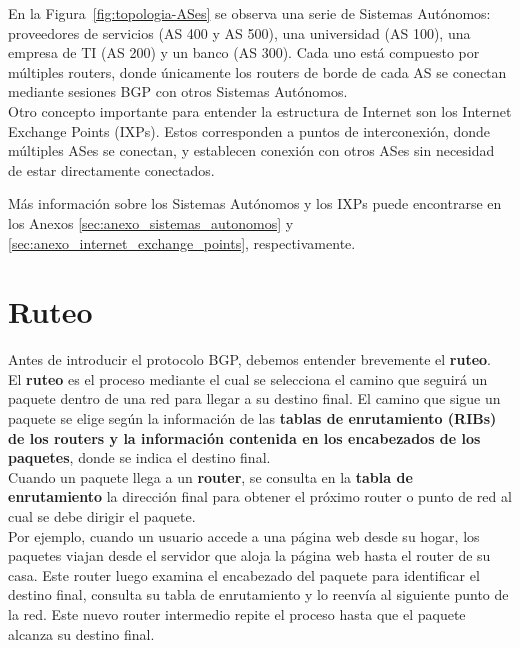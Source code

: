 En la Figura~\ref{fig:topologia-ASes} se observa una serie de Sistemas Autónomos: proveedores de servicios (AS 400 y AS 500), una universidad (AS 100), una empresa de TI (AS 200) y un banco (AS 300). Cada uno está compuesto por múltiples routers, donde únicamente los routers de borde de cada AS se conectan mediante sesiones BGP con otros Sistemas Autónomos.\\

Otro concepto importante para entender la estructura de Internet son los Internet Exchange Points (IXPs). Estos corresponden a puntos de interconexión, donde múltiples ASes se conectan, y establecen conexión con otros ASes sin necesidad de estar directamente conectados.

Más información sobre los Sistemas Autónomos y los IXPs puede encontrarse en los Anexos \ref{sec:anexo_sistemas_autonomos} y \ref{sec:anexo_internet_exchange_points}, respectivamente.


\section{Ruteo}


Antes de introducir el protocolo BGP, debemos entender brevemente el \textbf{ruteo}.\\


El \textbf{ruteo} es el proceso mediante el cual se selecciona el camino que seguirá un paquete dentro de una red para llegar a su destino final. 
El camino que sigue un paquete se elige según la información de las \textbf{{tablas de enrutamiento} (\textbf{RIBs}) de los routers y la información contenida en los \textbf{encabezados de los paquetes}}, donde se indica el destino final.\\



Cuando un paquete llega a un \textbf{router}, se consulta en la \textbf{tabla de enrutamiento} la dirección final para obtener el próximo router o punto de red al cual se debe dirigir el paquete.\\



Por ejemplo, cuando un usuario accede a una página web desde su hogar, los paquetes viajan desde el servidor que aloja la página web hasta el router de su casa. 
Este router luego examina el encabezado del paquete para identificar el destino final, consulta su tabla de enrutamiento y lo reenvía al siguiente punto de la red. 
Este nuevo router intermedio repite el proceso hasta que el paquete alcanza su destino final.\\



